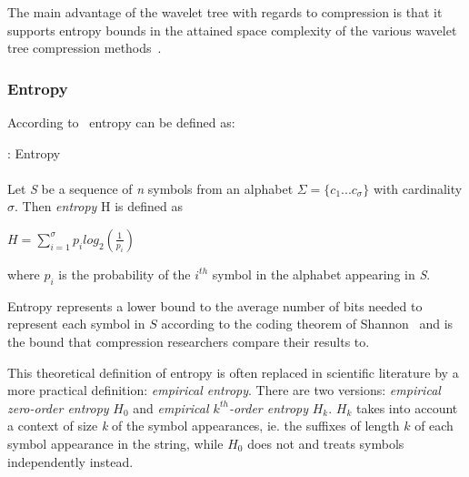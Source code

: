 The main advantage of the wavelet tree with regards to compression is that it supports entropy bounds in the attained space complexity of the various wavelet tree compression methods~\citep[Section~2.1]{WTSurvey}.

\subsubsection{Entropy}
According to~\citep[Introduction]{WTSurvey} entropy can be defined as:

\begin{mdframed}[nobreak, linecolor=lightgray, linewidth=2pt]
\begin{definition}: Entropy \\\\
Let \textit{S} be a sequence of \textit{n} symbols from an alphabet $\Sigma = \lbrace c_1 ... c_\sigma \rbrace$ with cardinality $\sigma$.
Then \textit{entropy} H is defined as
\begin{center}
$H = \sum_{i=1}^{\sigma} p_i log_2(\frac{1}{p_i})$
\end{center}
where $p_i$ is the probability of the $i^{th}$ symbol in the alphabet appearing in \textit{S}.
\end{definition} 
\end{mdframed}

Entropy represents a lower bound to the average number of bits needed to represent each symbol in $S$ according to the coding theorem of Shannon~\citep[Introduction]{WTSurvey} and is the bound that compression researchers compare their results to.

This theoretical definition of entropy is often replaced in scientific literature by a more practical definition: \textit{empirical entropy}.
There are two versions: \textit{empirical zero-order entropy} $H_0$ and \textit{empirical $k^{th}$-order entropy} $H_k$. $H_k$ takes into account a context of size \textit{k} of the symbol appearances, ie. the suffixes of length $k$ of each symbol appearance in the string, while $H_0$ does not and treats symbols independently instead. 

